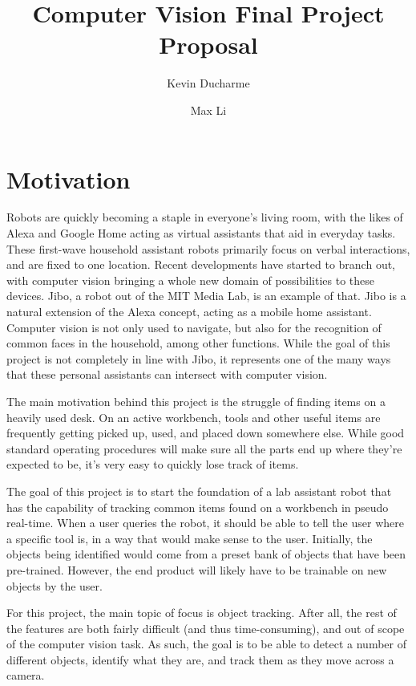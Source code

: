 \documentclass[11pt]{article}
\title{Computer Vision Final Project Proposal}
\author{Kevin Ducharme \and Max Li}
\begin{document}
\maketitle
\section{Motivation}
\par Robots are quickly becoming a staple in everyone’s living room, with the likes of Alexa and Google Home acting as virtual assistants that aid in everyday tasks. These first-wave household assistant robots primarily focus on verbal interactions, and are fixed to one location. Recent developments have started to branch out, with computer vision bringing a whole new domain of possibilities to these devices. Jibo, a robot out of the MIT Media Lab, is an example of that. Jibo is a natural extension of the Alexa concept, acting as a mobile home assistant. Computer vision is not only used to navigate, but also for the recognition of common faces in the household, among other functions. While the goal of this project is not completely in line with Jibo, it represents one of the many ways that these personal assistants can intersect with computer vision.

\par The main motivation behind this project is the struggle of finding items on a heavily used desk. On an active workbench, tools and other useful items are frequently getting picked up, used, and placed down somewhere else. While good standard operating procedures will make sure all the parts end up where they're expected to be, it's very easy to quickly lose track of items.
\par The goal of this project is to start the foundation of a lab assistant robot that has the capability of tracking common items found on a workbench in pseudo real-time. When a user queries the robot, it should be able to tell the user where a specific tool is, in a way that would make sense to the user. Initially, the objects being identified would come from a preset bank of objects that have been pre-trained. However, the end product will likely have to be trainable on new objects by the user. 
\par For this project, the main topic of focus is object tracking. After all, the rest of the features are both fairly difficult (and thus time-consuming), and out of scope of the computer vision task. As such, the goal is to be able to detect a number of different objects, identify what they are, and track them as they move across a camera.
\end{document}

